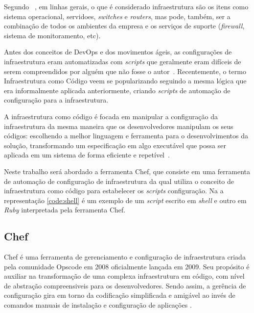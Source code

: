 Segundo ~, em linhas gerais, o que é considerado
infraestrutura são os itens como sistema operacional, servidoes,
\textit{switches} e \textit{routers}, mas pode, também, ser a combinação
de todos os ambientes da empresa e os serviços de suporte (\textit{firewall},
sistema de monitoramento, etc).

Antes dos conceitos de DevOps e dos movimentos ágeis, as configurações de
infraestrutura eram automatizadas com \textit{scripts} que geralmente eram
difíceis de serem compreendidos por alguém que não fosse o autor~\cite{huttermann:2012}.
Recentemente, o termo Infraestrutura como Código veem se popularizando
seguindo a mesma lógica que era informalmente aplicada anteriormente, criando
\textit{scripts} de automação de configuração para a infraestrutura.

A infraestrutura como código é focada em manipular a configuração da infraestrutura
da mesma maneira que os desenvolvedores manipulam os seus códigos: escolhendo a melhor
linguagem e ferramenta para o desenvolvimentos da solução, transformando um especificação
em algo executável que possa ser aplicada em um sistema de forma eficiente e
repetível~\cite{huttermann:2012}. \\

\noindent\begin{minipage}{.45\textwidth}
  \label{code:shell}
  \lstset{style=shell}
  
\end{minipage}\hfill
\begin{minipage}{.45\textwidth}
  \label{code:chef}
  \lstset{style=shell}
  
\end{minipage}


Neste trabalho será abordado a ferramenta Chef, que consiste em uma ferramenta de
automação de configuração de infraestrutura da qual utiliza o conceito de infraestrutura
como código para estabelecer os \textit{scripts} configuração. Na a representação \ref{code:shell}
é um exemplo de um \textit{script} escrito em \textit{shell} e outro em \textit{Ruby}
interpretada pela ferramenta Chef.

\subsection{Chef}
\label{sec:chef}

Chef é uma ferramenta de gerenciamento e configuração de infraestrutura criada
pela comunidade Opscode em 2008 oficialmente lançada em 2009. Seu propósito é
auxiliar na transformação de uma complexa infraestrutura em código, com nível
de abstração compreensiveis para os desenvolvedores. Sendo assim,
a gerência de configuração gira em torno da codificação simplificada e amigável
ao invés de comandos manuais de instalação e configuração de aplicações
\cite{sharma:2015}.

